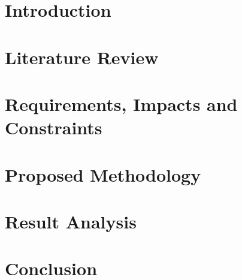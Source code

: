 \documentclass[Times,12pt,oneside,openany,print,index]{report}
\let\cleardoublepage=\clearpage %
\begin{document}
\cleardoublepage
{}
\printnomenclature %
\cleardoublepage


\chapter{Introduction}


\chapter{Literature Review}


\chapter{Requirements, Impacts and Constraints}



\chapter{Proposed Methodology}


\chapter{Result Analysis}



\chapter{Conclusion}


\printbibliography %

\end{document}
